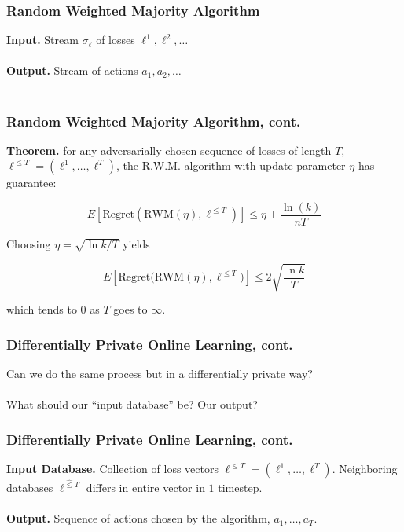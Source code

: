 \documentclass[aspectratio=169]{beamer}
\begin{document}
\begin{frame}
\frametitle{Random Weighted Majority Algorithm}

\textbf{Input.} Stream $\sigma_{\ell}$ of losses $\ell^1, \ell^2, \dots$\\~\\

\textbf{Output.} Stream of actions $a_1, a_2, \dots$\\~\\

\begin{algorithm}[H]
\begin{algorithmic}
  \EndFor
  \EndFor
  \EndProcedure
\end{algorithmic}
\end{algorithm}
\end{frame}

\begin{frame}
\frametitle{Random Weighted Majority Algorithm, cont.}

\textbf{Theorem.} for any adversarially chosen sequence of losses of length $T$, $\ell^{\leq T} = (\ell^1, \dots, \ell^T)$, the R.W.M. algorithm with update parameter $\eta$ has guarantee:

$$E[\text{Regret}(\text{RWM}(\eta), \ell^{\leq T})] \leq \eta + \frac{\ln(k)}{nT}$$

Choosing $\eta = \sqrt{\ln k/T}$ yields

$$E[\text{Regret(RWM}(\eta), \ell^{\leq T})] \leq 2\sqrt{\frac{\ln k}{T}}$$

which tends to $0$ as $T$ goes to $\infty$.
\end{frame}

\begin{frame}
\frametitle{Differentially Private Online Learning, cont.}

Can we do the same process but in a differentially private way?\\~\\

What should our ``input database'' be? Our output?
\end{frame}

\begin{frame}
\frametitle{Differentially Private Online Learning, cont.}
\textbf{Input Database.} Collection of loss vectors $\ell^{\leq T} = (\ell^1, \dots, \ell^T)$. Neighboring databases $\ell^{\hat{\leq}T}$ differs in entire vector in $1$ timestep.\\~\\

\textbf{Output.} Sequence of actions chosen by the algorithm, $a_1,\dots, a_T$.
\end{frame}
\end{document}
